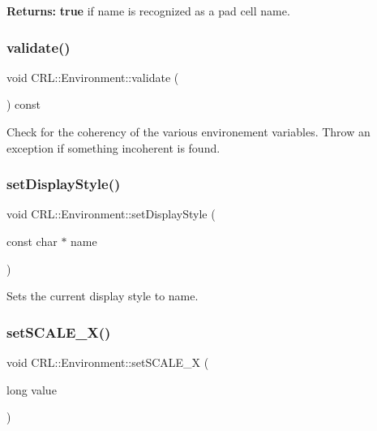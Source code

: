 {\bfseries Returns\+:} {\bfseries true} if {\ttfamily name} is recognized as a pad cell name. \mbox{\label{classCRL_1_1Environment_a4ea88dd9784318190a3705345c47904a}} 
\subsubsection{\texorpdfstring{validate()}{validate()}}
{\footnotesize\ttfamily void C\+R\+L\+::\+Environment\+::validate (\begin{DoxyParamCaption}{ }\end{DoxyParamCaption}) const}

Check for the coherency of the various environement variables. Throw an exception if something incoherent is found. \mbox{\label{classCRL_1_1Environment_a85fa721541a39571c3ade06992035bad}} 
\subsubsection{\texorpdfstring{set\+Display\+Style()}{setDisplayStyle()}}
{\footnotesize\ttfamily void C\+R\+L\+::\+Environment\+::set\+Display\+Style (\begin{DoxyParamCaption}\item[{const char $\ast$}]{name }\end{DoxyParamCaption})\hspace{0.3cm}{\ttfamily [inline]}}

Sets the current display style to {\ttfamily name}. \mbox{\label{classCRL_1_1Environment_ad14d519b0a4c964d7a786739499571dd}} 
\subsubsection{\texorpdfstring{set\+S\+C\+A\+L\+E\+\_\+\+X()}{setSCALE\_X()}}
{\footnotesize\ttfamily void C\+R\+L\+::\+Environment\+::set\+S\+C\+A\+L\+E\+\_\+X (\begin{DoxyParamCaption}\item[{long}]{value }\end{DoxyParamCaption})\hspace{0.3cm}{\ttfamily [inline]}}

